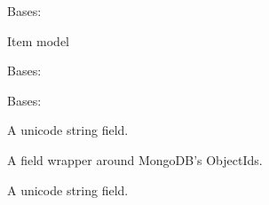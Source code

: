 \documentclass[letterpaper,10pt,english]{sphinxmanual}
\begin{document}
\begin{fulllineitems}
\label{app:app.models.Item}
Bases: 

Item model

\begin{fulllineitems}
\label{app:app.models.Item.DoesNotExist}
Bases: 

\end{fulllineitems}


\begin{fulllineitems}
\label{app:app.models.Item.MultipleObjectsReturned}
Bases: 

\end{fulllineitems}


\begin{fulllineitems}
\label{app:app.models.Item.description}
A unicode string field.

\end{fulllineitems}


\begin{fulllineitems}
\label{app:app.models.Item.id}
A field wrapper around MongoDB's ObjectIds.

\end{fulllineitems}


\begin{fulllineitems}
\label{app:app.models.Item.name}
A unicode string field.

\end{fulllineitems}



\end{fulllineitems}
\end{document}
